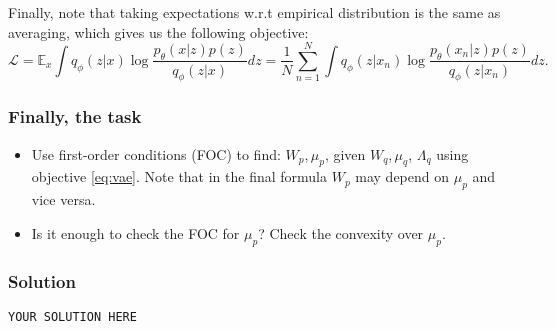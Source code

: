 \documentclass{article}
\begin{document}
Finally, note that taking expectations w.r.t empirical distribution is the same as averaging, which gives us the following objective:
\begin{equation}\label{eq:vae}
\mathcal{L} = \mathbb{E}_{x}\int q_{\phi}(z|x) \log \frac{p_{\theta}(x|z)p(z)}{q_{\phi}(z|x)}dz = \frac1N \sum_{n=1}^N \int q_{\phi}(z|x_n) \log \frac{p_{\theta}(x_n|z)p(z)}{q_{\phi}(z|x_n)}dz.
\end{equation}

\subsubsection*{Finally, the task}
\begin{itemize}
    \item Use first-order conditions (FOC) to find: $W_p, \mu_p$, given $W_q, \mu_q$, $\Lambda_{q}$ using objective \eqref{eq:vae}. Note that in the final formula $W_p$ may depend on $\mu_p$ and vice versa. 
    \item Is it  enough to check the FOC for $\mu_p$? Check the convexity over $\mu_p$.
\end{itemize}
\subsubsection*{Solution}
\texttt{YOUR SOLUTION HERE}

\end{document}
